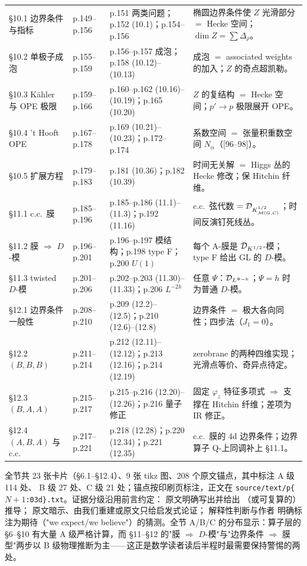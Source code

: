\begin{longtable}{@{}p{2.2cm}p{1.5cm}p{4.9cm}p{6.4cm}@{}}
\S10.1 边界条件与指标 & p.149--p.156 & p.151 两类问题；p.152 (10.1)；p.154--p.156 & 椭圆边界条件使 $Z$ 光滑部分 $=$ Hecke 空间；$\dim Z=\sum\Delta_\rho$。\\
\S10.2 单极子成泡 & p.155--p.159 & p.156--p.157 成泡；p.158 (10.12)--(10.13) & 成泡 $=$ associated weights 的加入；$Z$ 的奇点超凯勒。\\
\S10.3 Kähler 与 OPE 极限 & p.159--p.166 & p.160--p.162 (10.16)--(10.19)；p.165 (10.20) & $Z$ 的复结构 $=$ Hecke 空间；$p'\to p$ 极限展开 OPE。\\
\S10.4 't Hooft OPE & p.167--p.178 & p.169 (10.21)--(10.23)；p.172--p.174 & 系数空间 $=$ 张量积重数空间 $N_\alpha$（$[96$--$98]$）。\\
\S10.5 \mbox{扩展方程} & p.179--p.183 & p.181 (10.36)；p.182 (10.39) & 时间无关解 $=$ Higgs 丛的 Hecke 修改；保 Hitchin 纤维。\\
\S11.1 c.c.\ 膜 & p.185--p.196 & p.185--p.186 (11.1)--(11.3)；p.192 (11.16) & c.c.\ 弦代数 $=\mathcal{D}_{K_{\mathcal{M}(G,C)}^{1/2}}$；时间反演钉死线丛。\\
\S11.2 膜 $\Rightarrow$ $D$-模 & p.196--p.201 & p.196--p.197 模结构；p.198 type F；p.200 $U(1)$ & 每个 A-膜是 $\mathcal{D}_{K^{1/2}}$-模；type F 给出 GL 的 $D$-模。\\
\S11.3 twisted $D$-模 & p.201--p.206 & p.202--p.203 (11.30)--(11.33)；p.206 $L^{-2h}$ & 任意 $\Psi$：$\mathcal{D}_{L^{\Psi-h}}$；$\Psi=h$ 时为普通 $D$-模。\\
\S12.1 边界条件一般性 & p.208--p.210 & p.209 (12.2)--(12.5)；p.210 (12.6)--(12.8) & 边界条件 $=$ 极大各向同性；四步法（$J_1=0$）。\\
\S12.2 $(B,B,B)$ & p.211--p.214 & p.212 (12.11)--(12.12)；p.213 (12.16)；p.214 (12.19) & zerobrane 的两种四维实现；光滑点等价、奇异点待定。\\
\S12.3 $(B,A,A)$ & p.215--p.217 & p.215--p.216 (12.20)--(12.26)；p.216 量子修正 & 固定 $\varphi_z$ 特征多项式 $\Rightarrow$ 支撑在 Hitchin 纤维；差项为 IR 修正。\\
\S12.4 $(A,B,A)$ 与 c.c. & p.217--p.221 & p.218 (12.28)；p.220 (12.34)；p.221 (12.35) & c.c.\ 膜的 4d 边界条件；边界算子 Q-上同调补上 \S11.1。\\
\bottomrule
\end{longtable}
\endgroup

\noindent 全节共 23 张卡片（\S6.1--\S12.4）、9 张 tikz 图、208 个原文锚点，其中标注 A 级 114 处、
B 级 27 处、C 级 21 处；锚点按印刷页标注，正文在
\texttt{source/text/p\{$N+1$:03d\}.txt}。证据分级沿用前言约定：\pA{} 原文明确写出并给出
（或可复算的）推导；\pB{} 原文暗示、由我们重建或原文只给启发式论证；\pC{} 解释性判断与作者
明确标注为期待（"we expect/we believe"）的猜测。全节 A/B/C 的分布显示：算子层的
\S6--\S10 有大量 A 级严格计算，而 \S11--\S12 的"膜 $\Rightarrow$ $D$-模"与"边界条件 $\Rightarrow$
膜型"两步以 B 级物理推断为主——这正是数学读者读后半程时最需要保持警惕的两处。
